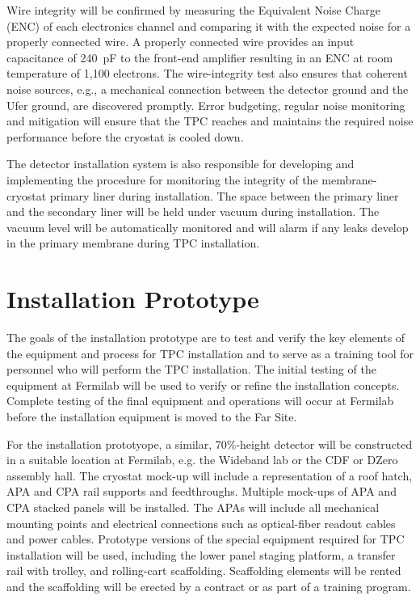 Wire integrity will be confirmed by measuring the Equivalent Noise Charge (ENC) of each electronics channel and comparing it with the expected noise for a properly connected wire. A properly connected wire provides an input capacitance of 240~pF to the front-end amplifier resulting in an ENC at room temperature of 1,100 electrons.
The wire-integrity test also ensures that coherent noise sources, e.g., a mechanical connection between the detector ground and the Ufer ground, are discovered promptly. Error budgeting, regular noise monitoring and mitigation will ensure that the TPC reaches and maintains the required noise performance before the cryostat is cooled down.


The detector installation system is also responsible for developing and implementing the procedure for monitoring the integrity of the membrane-cryostat primary liner during installation.  The space between the primary liner and the secondary liner will be held under vacuum during installation. The vacuum level will be automatically monitored and will alarm if any leaks develop in the primary membrane during TPC installation.


\section{Installation Prototype} 

The goals of the installation prototype are to test and verify the key elements of the equipment and process for TPC installation and to serve as a training tool for personnel who will perform the TPC installation. The initial testing of the equipment at Fermilab will be used to verify or refine the installation concepts. Complete testing of the final equipment and operations will occur at Fermilab before the installation equipment is moved to the Far Site. 

For the installation prototyope, a similar, 70\%-height detector will be constructed in a suitable location at Fermilab, e.g. the Wideband lab or the CDF or DZero assembly hall. 
The cryostat mock-up will include a representation of a roof hatch, APA and CPA rail supports and feedthroughs. 
Multiple mock-ups of APA and CPA stacked panels will be installed. The APAs will include all mechanical mounting points and electrical connections such as optical-fiber readout cables and power cables.
Prototype versions of the special equipment required for TPC installation will be used, including the lower panel staging platform, a transfer rail with trolley, and rolling-cart scaffolding. Scaffolding elements will be rented and the scaffolding will be erected by a contract or as part of a training program.

